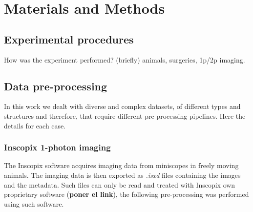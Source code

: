 
\chapter{Materials and Methods} %

\label{Chapter3} %

\section{Experimental procedures}
\label{chap3:sec:1:exp_proc}
How was the experiment performed? (briefly) animals, surgeries, 1p/2p imaging.

\section{Data pre-processing}
\label{chap3:sec:2:preproc}
In this work we dealt with diverse and complex datasets, of different types and structures and therefore, that require different pre-processing pipelines. 
Here the details for each case.
\subsection{Inscopix 1-photon imaging}
\label{chap3:sec:2:subsec1:inscopix-pre-proc}
The Inscopix software acquires imaging data from miniscopes in freely moving animals. The imaging data is then exported as \textit{.isxd} files containing the images and the metadata. 
Such files can only be read and treated with Inscopix own proprietary software (\textbf{poner el link}), the following pre-processing was performed using such software. 

